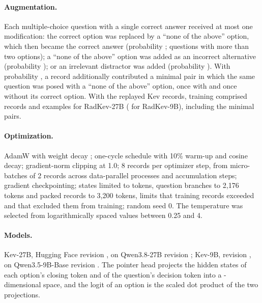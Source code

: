 \documentclass[11pt]{article}
\begin{document}
\paragraph{Augmentation.} Each multiple-choice question with a single correct answer received at most one modification: the correct option was replaced by a ``none of the above'' option, which then became the correct answer (probability ; questions with more than two options); a ``none of the above'' option was added as an incorrect alternative (probability ); or an irrelevant distractor was added (probability ). With probability , a record additionally contributed a minimal pair in which the same question was posed with a ``none of the above'' option, once with and once without its correct option. With the  replayed Kev records, training comprised  records and  examples for RadKev-27B ( for RadKev-9B), including the minimal pairs.

\paragraph{Optimization.} AdamW with weight decay ; one-cycle schedule with 10\% warm-up and cosine decay; gradient-norm clipping at 1.0; 8 records per optimizer step, from micro-batches of 2 records across data-parallel processes and accumulation steps; gradient checkpointing; states limited to  tokens, question branches to 2,176 tokens and packed records to 3,200 tokens, limits that  training records exceeded and that excluded them from training; random seed 0. The temperature was selected from  logarithmically spaced values between 0.25 and 4.

\paragraph{Models.} Kev-27B, Hugging Face revision , on Qwen3.8-27B revision ; Kev-9B, revision , on Qwen3.5-9B-Base revision . The pointer head projects the hidden states of each option's closing token and of the question's decision token into a -dimensional space, and the logit of an option is the scaled dot product of the two projections.
\end{document}
